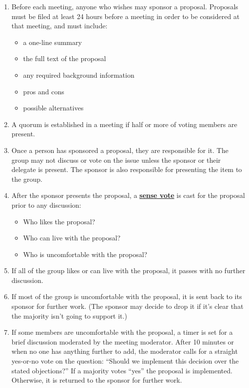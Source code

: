 \documentclass[
]{krantz}
\providecommand{\tightlist}{%
  \setlength{\itemsep}{0pt}\setlength{\parskip}{0pt}}
\newcommand{\gref}[2]{\hyperlink{#2}{\textbf{#1}}}
\begin{document}
\begin{enumerate}
\def\labelenumi{\arabic{enumi}.}
\item
  Before each meeting, anyone who wishes may sponsor a proposal.
  Proposals must be filed at least 24 hours before a meeting
  in order to be considered at that meeting, and must include:

  \begin{itemize}
  \tightlist
  \item
    a one-line summary
  \item
    the full text of the proposal
  \item
    any required background information
  \item
    pros and cons
  \item
    possible alternatives
  \end{itemize}
\item
  A quorum is established in a meeting if half or more of voting members are present.
\item
  Once a person has sponsored a proposal, they are responsible for it.
  The group may not discuss or vote on the issue unless the sponsor or their delegate is present.
  The sponsor is also responsible for presenting the item to the group.
\item
  After the sponsor presents the proposal,
  a \gref{sense vote}{sense\_vote} is cast for the proposal prior to any discussion:

  \begin{itemize}
  \tightlist
  \item
    Who likes the proposal?
  \item
    Who can live with the proposal?
  \item
    Who is uncomfortable with the proposal?
  \end{itemize}
\item
  If all of the group likes or can live with the proposal,
  it passes with no further discussion.
\item
  If most of the group is uncomfortable with the proposal,
  it is sent back to its sponsor for further work.
  (The sponsor may decide to drop it if it's clear that
  the majority isn't going to support it.)
\item
  If some members are uncomfortable with the proposal,
  a timer is set for a brief discussion moderated by the meeting moderator.
  After 10 minutes or when no one has anything further to add,
  the moderator calls for a straight yes-or-no vote on the question:
  ``Should we implement this decision over the stated objections?''
  If a majority votes ``yes'' the proposal is implemented.
  Otherwise, it is returned to the sponsor for further work.
\end{enumerate}
\end{document}
